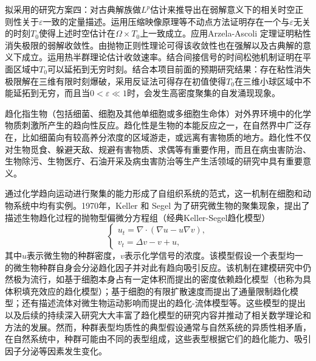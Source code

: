 \documentclass[12pt]{article}
\begin{document}
拟采用的研究方案四：对古典解族做$L^p$估计来推导出在弱解意义下的相关时空正则性关于$\varepsilon$一致的定量描述。运用压缩映像原理等不动点方法证明存在一个与$\varepsilon$无关的时刻$T_0$使得上述时空估计在$\Omega\times T_0$上一致成立。应用Arzela-Ascoli 定理证明粘性消失极限的弱解收敛性。由抛物正则性理论可得该收敛性也在强解以及古典解的意义下成立。运用热半群理论估计收敛速率。结合间接信号的时间松弛机制证明在平面区域中$T_0$可以延拓到无穷时刻。结合本项目前面的预期研究结果：存在粘性消失极限解在三维有限时刻爆破，采用反证法可得存在初值使得$T_0$在三维小球区域中不能延拓到无穷，而且当$0<\varepsilon\ll1$时，会发生高密度聚集的自发涌现现象。







趋化指生物（包括细菌、细胞及其他单细胞或多细胞生命体）对外界环境中的化学物质刺激所产生的趋向性反应。趋化性是生物的本能反应之一，在自然界中广泛存在，比如细菌向有较高养分浓度的区域游走，或远离有害物质的地方。趋化性不仅对生物觅食、躲避天敌、规避有害物质、求偶等有重要作用，而且在病虫害防治、生物除污、生物医疗、石油开采及病虫害防治等生产生活领域的研究中具有重要意义。

通过化学趋向运动进行聚集的能力形成了自组织系统的范式，这一机制在细胞和动物系统中均有实例。1970年，Keller 和 Segel 为了研究微生物的聚集现象，提出了描述生物趋化过程的抛物型偏微分方程组（经典Keller-Segel趋化模型）
\begin{equation}
    \begin{cases}
        u_t = \nabla \cdot(\nabla u - u\nabla v), \\ 
        v_t = \Delta v - v + u,
    \end{cases}
\end{equation} 
其中$u$表示微生物的种群密度，$v$表示化学信号的浓度。该模型假设一个表型均一的微生物种群自身会分泌趋化因子并对此有趋向吸引反应。该机制在建模研究中仍然极为流行，如基于细胞本身占有一定体积而提出的密度依赖趋化模型（也称为具体积填充效应的趋化模型）；基于细胞的有限扩散速度而提出了通量限制趋化模型；还有描述流体对微生物运动影响而提出的趋化-流体模型等。这些模型的提出以及后续的持续深入研究大大丰富了趋化模型的研究内容并推动了相关数学理论和方法的发展。然而，种群表型均质性的典型假设通常与自然系统的异质性相矛盾，在自然系统中，种群可能由不同的表型组成，这些表型根据它们的趋化能力、吸引因子分泌等因素发生变化。
\end{document}
